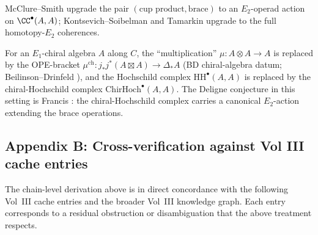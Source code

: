 McClure--Smith \cite{McClureSmith} upgrade the pair
$(\text{cup product}, \text{brace})$ to an $E_2$-operad action on
$\CC^\bullet(A, A)$; Kontsevich--Soibelman
\cite{KontsevichSoibelmanDefI} and Tamarkin \cite{TamarkinDGCat}
upgrade to the full homotopy-$E_2$ coherences.

For an $E_1$-chiral algebra $A$ along $C$, the ``multiplication''
$\mu \colon A \otimes A \to A$ is replaced by the OPE-bracket
$\mu^{\mathrm{ch}} \colon j_* j^*(A \boxtimes A) \to \Delta_* A$ (BD
chiral-algebra datum; Beilinson--Drinfeld \cite{BeilinsonDrinfeldCA}),
and the Hochschild complex $\mathrm{HH}^\bullet(A, A)$ is replaced by
the chiral-Hochschild complex
$\mathrm{ChirHoch}^\bullet(A, A)$.  The Deligne conjecture in this
setting is Francis \cite[\S 2]{Francis2013}: the chiral-Hochschild
complex carries a canonical $E_2$-action extending the brace
operations.

\subsection*{Appendix B: Cross-verification against Vol III cache entries}

The chain-level derivation above is in direct concordance with the
following Vol~III cache entries and the broader Vol~III knowledge
graph.  Each entry corresponds to a residual obstruction or
disambiguation that the above treatment respects.

